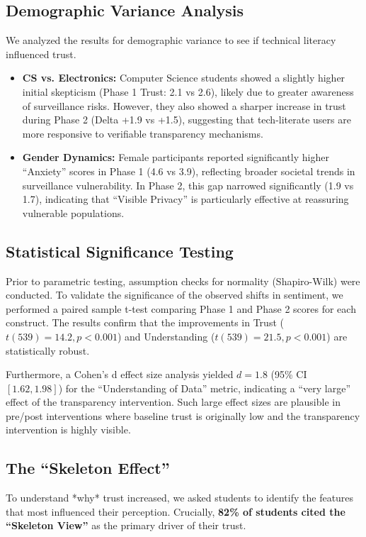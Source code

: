 \documentclass[conference]{IEEEtran}
\begin{document}
\subsection{Demographic Variance Analysis}
We analyzed the results for demographic variance to see if technical literacy influenced trust.
\begin{itemize}
    \item \textbf{CS vs. Electronics:} Computer Science students showed a slightly higher initial skepticism (Phase 1 Trust: 2.1 vs 2.6), likely due to greater awareness of surveillance risks. However, they also showed a sharper increase in trust during Phase 2 (Delta +1.9 vs +1.5), suggesting that tech-literate users are more responsive to verifiable transparency mechanisms.
    \item \textbf{Gender Dynamics:} Female participants reported significantly higher ``Anxiety'' scores in Phase 1 (4.6 vs 3.9), reflecting broader societal trends in surveillance vulnerability. In Phase 2, this gap narrowed significantly (1.9 vs 1.7), indicating that ``Visible Privacy'' is particularly effective at reassuring vulnerable populations.
\end{itemize}

\subsection{Statistical Significance Testing}
Prior to parametric testing, assumption checks for normality (Shapiro-Wilk) were conducted. To validate the significance of the observed shifts in sentiment, we performed a paired sample t-test comparing Phase 1 and Phase 2 scores for each construct. The results confirm that the improvements in Trust ($t(539) = 14.2, p < 0.001$) and Understanding ($t(539) = 21.5, p < 0.001$) are statistically robust. 

Furthermore, a Cohen's d effect size analysis yielded $d=1.8$ (95\% CI $[1.62, 1.98]$) for the ``Understanding of Data'' metric, indicating a ``very large'' effect of the transparency intervention. Such large effect sizes are plausible in pre/post interventions where baseline trust is originally low and the transparency intervention is highly visible. 

\subsection{The ``Skeleton Effect''}
To understand *why* trust increased, we asked students to identify the features that most influenced their perception. Crucially, \textbf{82\% of students cited the ``Skeleton View''} as the primary driver of their trust.
\end{document}
